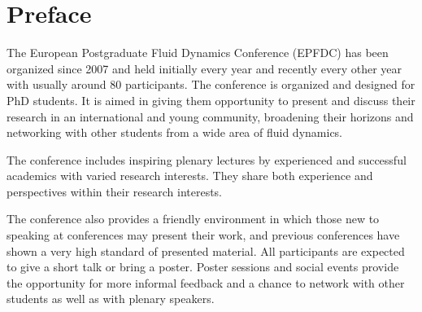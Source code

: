 \section*{Preface}

\vspace{.5cm}

The European Postgraduate Fluid Dynamics Conference (EPFDC) has been organized since 2007 and held initially every year and recently every other year with usually around 80 participants. The conference is organized and designed for PhD students. It is aimed in giving them opportunity to present and discuss their research in an international and young community, broadening their horizons and networking with other students from a wide area of fluid dynamics.

The conference includes inspiring plenary lectures by experienced and successful academics with varied research interests. They share both experience and perspectives within their research interests.

The conference also provides a friendly environment in which those new to speaking at conferences may present their work, and previous conferences have shown a very high standard of presented material. All participants are expected to give a short talk or bring a poster. Poster sessions and social events provide the opportunity for more informal feedback and a chance to network with other students as well as with plenary speakers.
